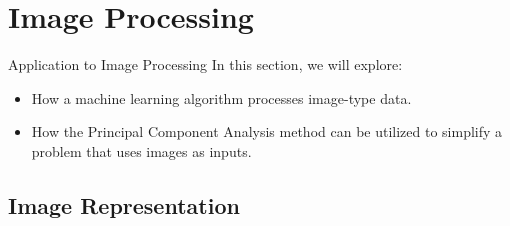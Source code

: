 \section[Image Processing]{Image Processing}

\begin{frame}{Application to Image Processing}
	In this section, we will explore:
	\begin{itemize}
		\item How a machine learning algorithm processes image-type data.
		\item How the Principal Component Analysis method can be utilized to simplify a problem that uses images as inputs.
	\end{itemize}
\end{frame}

\subsection[Image Representation]{Image Representation}

